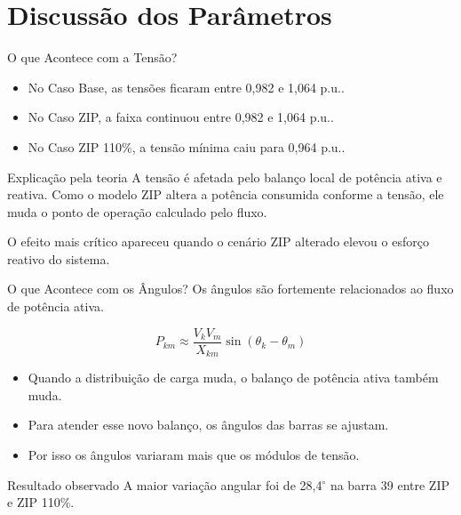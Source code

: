 \documentclass[aspectratio=169,11pt]{beamer}
\newcommand{\casobase}{Caso Base}
\newcommand{\casozip}{Caso ZIP}
\newcommand{\casozipcento}{Caso ZIP 110\%}
\newcommand{\pu}{p.u.}
\begin{document}
\section{Discussão dos Parâmetros}

\begin{frame}{O que Acontece com a Tensão?}
  \begin{itemize}
    \item No \casobase, as tensões ficaram entre 0,982 e 1,064 \pu.
    \item No \casozip, a faixa continuou entre 0,982 e 1,064 \pu.
    \item No \casozipcento, a tensão mínima caiu para 0,964 \pu.
  \end{itemize}

  \begin{block}{Explicação pela teoria}
    A tensão é afetada pelo balanço local de potência ativa e reativa. Como o modelo ZIP altera a potência consumida conforme a tensão, ele muda o ponto de operação calculado pelo fluxo.
  \end{block}

  O efeito mais crítico apareceu quando o cenário ZIP alterado elevou o esforço reativo do sistema.
\end{frame}

\begin{frame}{O que Acontece com os Ângulos?}
  Os ângulos são fortemente relacionados ao fluxo de potência ativa.

  \[
    P_{km} \approx \frac{V_k V_m}{X_{km}}\sin(\theta_k-\theta_m)
  \]

  \begin{itemize}
    \item Quando a distribuição de carga muda, o balanço de potência ativa também muda.
    \item Para atender esse novo balanço, os ângulos das barras se ajustam.
    \item Por isso os ângulos variaram mais que os módulos de tensão.
  \end{itemize}

  \begin{block}{Resultado observado}
    A maior variação angular foi de 28,4$^\circ$ na barra 39 entre ZIP e ZIP 110\%.
  \end{block}
\end{frame}
\end{document}

